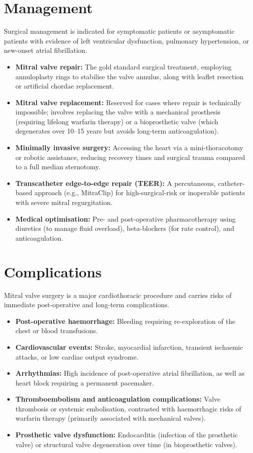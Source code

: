 \section*{Management}
Surgical management is indicated for symptomatic patients or asymptomatic patients with evidence of left ventricular dysfunction, pulmonary hypertension, or new-onset atrial fibrillation.
\begin{itemize}
    \item \textbf{Mitral valve repair:} The gold standard surgical treatment, employing annuloplasty rings to stabilise the valve annulus, along with leaflet resection or artificial chordae replacement.
    \item \textbf{Mitral valve replacement:} Reserved for cases where repair is technically impossible; involves replacing the valve with a mechanical prosthesis (requiring lifelong warfarin therapy) or a bioprosthetic valve (which degenerates over 10--15 years but avoids long-term anticoagulation).
    \item \textbf{Minimally invasive surgery:} Accessing the heart via a mini-thoracotomy or robotic assistance, reducing recovery times and surgical trauma compared to a full median sternotomy.
    \item \textbf{Transcatheter edge-to-edge repair (TEER):} A percutaneous, catheter-based approach (e.g., MitraClip) for high-surgical-risk or inoperable patients with severe mitral regurgitation.
    \item \textbf{Medical optimisation:} Pre- and post-operative pharmacotherapy using diuretics (to manage fluid overload), beta-blockers (for rate control), and anticoagulation.
\end{itemize}

\section*{Complications}
Mitral valve surgery is a major cardiothoracic procedure and carries risks of immediate post-operative and long-term complications.
\begin{itemize}
    \item \textbf{Post-operative haemorrhage:} Bleeding requiring re-exploration of the chest or blood transfusions.
    \item \textbf{Cardiovascular events:} Stroke, myocardial infarction, transient ischaemic attacks, or low cardiac output syndrome.
    \item \textbf{Arrhythmias:} High incidence of post-operative atrial fibrillation, as well as heart block requiring a permanent pacemaker.
    \item \textbf{Thromboembolism and anticoagulation complications:} Valve thrombosis or systemic embolisation, contrasted with haemorrhagic risks of warfarin therapy (primarily associated with mechanical valves).
    \item \textbf{Prosthetic valve dysfunction:} Endocarditis (infection of the prosthetic valve) or structural valve degeneration over time (in bioprosthetic valves).
\end{itemize}

